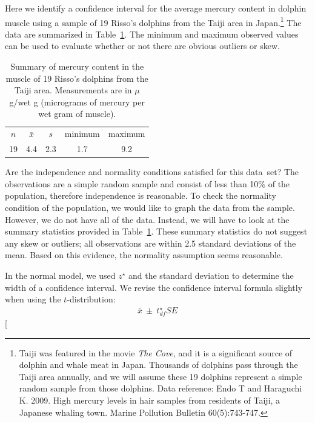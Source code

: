 Here we identify a confidence interval for the average mercury content in dolphin muscle using a sample of 19 Risso's dolphins from the Taiji area in Japan.\footnote{Taiji was featured in the movie \emph{The Cove}, and it is a significant source of dolphin and whale meat in Japan. Thousands of dolphins pass through the Taiji area annually, and we will assume these 19 dolphins represent a simple random sample from those dolphins. Data reference: Endo T and Haraguchi K. 2009. High mercury levels in hair samples from residents of Taiji, a Japanese whaling town. Marine Pollution Bulletin 60(5):743-747.} The data are summarized in Table~\ref{summaryStatsOfHgInMuscleOfRissosDolphins}. The minimum and maximum observed values can be used to evaluate whether or not there are obvious outliers or skew.

\begin{table}[h]
\centering
\begin{tabular}{ccc cc}
\hline
$n$ & $\bar{x}$ & $s$ & minimum & maximum \\
19   & 4.4	  & 2.3  & 1.7	       & 9.2 \\
\hline
\end{tabular}
\caption{Summary of mercury content in the muscle of 19 Risso's dolphins from the Taiji area. Measurements are in $\mu$g/wet g (micrograms of mercury per wet gram of muscle).}
\label{summaryStatsOfHgInMuscleOfRissosDolphins}
\end{table}

\begin{example}{Are the independence and normality conditions satisfied for this data~set?}
The observations are a simple random sample and consist of less than 10\% of the population, therefore independence is reasonable. To check the normality condition of the population, we would like to graph the data from the sample. However, we do not have all of the data. Instead, we will have to look at the summary statistics provided in Table~\ref{summaryStatsOfHgInMuscleOfRissosDolphins}. These summary statistics do not suggest any skew or outliers; all observations are within 2.5 standard deviations of the mean. Based on this evidence, the normality assumption seems reasonable.
\end{example}

In the normal model, we used $z^{\star}$ and the standard deviation to determine the width of a confidence interval. We revise the confidence interval formula slightly when using the $t$-distribution:
\begin{eqnarray*}
\bar{x} \ \pm\  t^{\star}_{df}SE
\end{eqnarray*}
\marginpar[\raggedright\vspace{-9mm}

